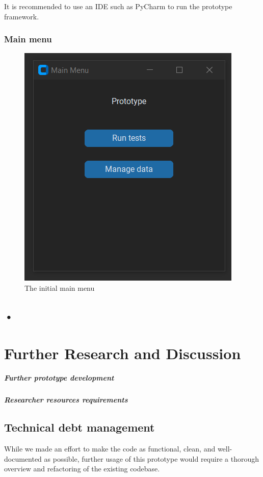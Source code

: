 \documentclass[masterthesis]{fer}
\begin{document}
It is recommended to use an IDE such as PyCharm to run the prototype framework.
\subsection{Main menu}
\begin{figure}[htb]
  \centering
  \includegraphics[width=0.5\linewidth]{Figures/thesis main menu.png} 
  \caption{The initial main menu}
  \label{slk:thesis_main_menu}
\end{figure}

\section{•}


\chapter{Further Research and Discussion}

\paragraph{Further prototype development}
\label{sec:further_research_suggestions}
\paragraph{Researcher resources requirements}
\section{Technical debt management}
While we made an effort to make the code as functional, clean, and well-documented as possible,
further usage of this prototype would require a thorough overview and refactoring of the existing codebase.
\end{document}

